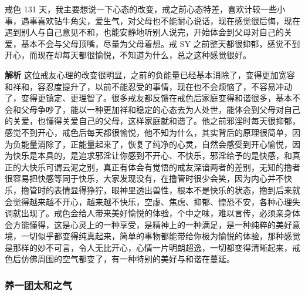 \begin{case}
    戒色 131 天，我主要想说一下心态的改变，戒之前心态特差，喜欢计较一些小事，遇事喜欢钻牛角尖，爱生气，对父母也不能耐心说话，现在感觉很后悔，现在遇到别人与自己意见不和，也能安静地听别人说完，开始体会到父母对自己的关爱，基本不会与父母顶嘴，尽量为父母着想。戒 SY 之前整天都很抑郁，感觉不到开心，而现在却每天都很愉悦，不知道为什么，总之这种感觉很好。

    \textbf{解析} 这位戒友心理的改变很明显，之前的负能量已经基本消除了，变得更加宽容和祥和，容忍度提升了，以前不能忍受的事情，现在也不会烦恼了，不容易冲动了，变得更镇定、更理智了。很多戒友都反馈在戒色后家庭变得和谐很多，基本不会和父母争吵了，能以一种更加祥和稳定的心态去为人处世，能体会到父母对自己的关爱，也懂得关爱自己的父母，这样家庭就和谐了。他之前邪淫时每天很抑郁，感觉不到开心，戒色后每天都很愉悦，他不知为什么，其实背后的原理很简单，因为负能量消除了，正能量起来了，恢复了纯净的心灵，自然会感受到开心愉悦，因为快乐是本具的，是追求邪淫让你感到不开心、不快乐，邪淫给予的是快感，和真正的大快乐可谓云泥之别，真正有体会有觉悟的戒友深谙两者的差别，无知的撸者很容易把快感等同于快乐，大家发现没有，在撸管时很少会笑，因为内心并不快乐，撸管时的表情显得狰狞，眼神里透出兽性，根本不是快乐的状态，撸到后来就会觉得越来越不开心，越来越不快乐，空虚、焦虑、抑郁、惶恐不安，各种心理失调就出现了。戒色会给人带来美好愉悦的体验，个中之味，难以言传，必须亲身体会方能懂得，这是心灵上的一种享受，是精神上的一种满足，是一种纯粹的美好意境，一切似乎都变得纯真起来，简单的事物都能带给你极为愉悦的体验，那种感觉是那样的妙不可言，令人无比开心，心情一片明朗超逸，一切都变得清晰起来，戒色后仿佛周围的空气都变了，有一种特别的美好与和谐在蔓延。
\end{case}

\subsubsection{养一团太和之气}

